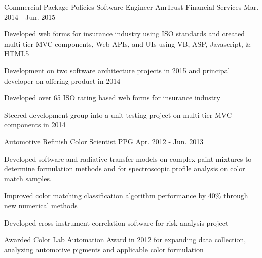 \begin{cventries}
  \cventry
    {Commercial Package Policies}
    {Software Engineer} %
    {AmTrust Financial Services}
    {Mar. 2014 - Jun. 2015}
    {
      \begin{cvparagraph}
        Developed web forms for insurance industry using ISO standards and created multi-tier MVC components, Web APIs, and UIs using VB, ASP, Javascript, \& HTML5
      \end{cvparagraph}
      \begin{cvitems} %
        \item {Development on two software architecture projects in 2015 and principal developer on offering product in 2014}
        \item {Developed over 65 ISO rating based web forms for insurance industry}
        \item {Steered development group into a unit testing project on multi-tier MVC components in 2014}
      \end{cvitems}
    }

  \cventry
    {Automotive Refinish} %
    {Color Scientist} %
    {PPG} %
    {Apr. 2012 - Jun. 2013}
    {
      \begin{cvparagraph}
        Developed software and radiative transfer models on complex paint mixtures to determine formulation methods and for spectroscopic profile analysis on color match samples.
      \end{cvparagraph}
      \begin{cvitems} %
        \item {Improved color matching classification algorithm performance by 40\% through new numerical methods}
        \item {Developed cross-instrument correlation software for risk analysis project}
        \item {Awarded Color Lab Automation Award in 2012 for expanding data collection, analyzing automotive pigments and applicable color formulation}
      \end{cvitems}
    }


\end{cventries}
